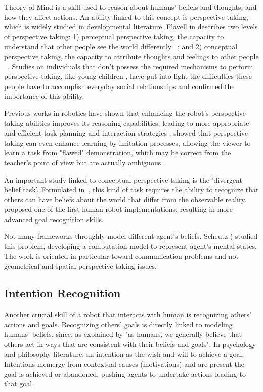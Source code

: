 Theory of Mind \cite{premack1978does} is a skill used to reason about humans' beliefs and thoughts, and how they affect actions. An ability linked to this concept is perspective taking, which is widely studied in developmental literature.  Flavell in \cite{flavell1977development} describes two levels of perspective taking: 
1) perceptual perspective taking,  the capacity to understand that other people see the world differently ~\cite{Tversky1999}; and 2) conceptual perspective taking, the capacity to attribute thoughts and feelings to other people ~\cite{Baron1985}. Studies on individuals that don't possess the required mechanisms to perform perspective taking, like young children \cite{frick2014picturing}, have put into light the difficulties these people have to accomplish everyday social relationships and confirmed the importance of this ability.

Previous works in robotics have shown that enhancing the robot's perspective taking abilities improves its reasoning capabilities, leading to more appropriate and efficient task planning and interaction strategies \cite{Trafton2005,ros2010one}. \cite{breazeal2006} showed that perspective taking can even enhance learning by imitation processes, allowing the viewer to learn a task from "flawed" demonstration, which may be correct from the teacher's point of view but are actually ambiguous. 

An important study linked to conceptual perspective taking is the 'divergent belief task'.  Formulated in~\cite{wimmer1983}, this kind of task requires the ability to recognize that others can have beliefs about the world that differ from the observable reality. ~\cite{BreazealGB09} proposed one of the first human-robot implementations, resulting in more advanced goal recognition skills. 

Not many frameworks throughly model different agent's beliefs.  Scheutz \cite{scheutz2013computational}) studied this problem, developing a computation model to represent agent's mental states. The work is oriented in particular toward communication problems and not geometrical and spatial perspective taking issues.

\subsection{Intention Recognition}
Another crucial skill of a robot that interacts with human is recognizing others' actions and goals. Recognizing others' goals is directly linked to modeling humans' beliefs, since, as explained by \cite{byom2013theory} "as humans, we generally believe that others act in ways that are consistent with their beliefs and goals". In psychology \cite{bruner1981} and philosophy \cite{bratman1984} literature, an intention as the wish and will to achieve a goal. Intentions memerge from contextual causes (motivations) and are present the goal is achieved or abandoned, pushing agents to undertake actions leading to that goal.

